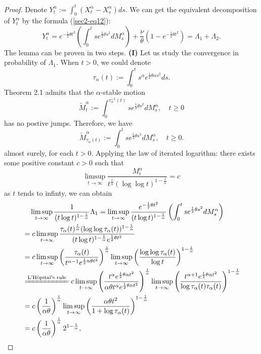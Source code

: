 \documentclass[11pt]{amsart}
\theoremstyle{plain}
\numberwithin{equation}{section}
\begin{document}
\begin{proof}
Denote $Y_t^\alpha:=\int_0^t \left(X_t^\alpha-X_s^\alpha\right)ds$. We can get the equivalent decomposition of $Y_t^\alpha$ by the formula (\ref{sec2-eq12}):
\begin{equation*}
Y_t^\alpha =  e^{-\frac{1}{2}\theta t^2} \left(\int_0^t se^{\frac{1}{2}\theta s^2}dM_s^\alpha \right) +\frac{\nu}{\theta}\left(1-e^{-\frac{1}{2}\theta t^2}\right)=\Lambda_1+\Lambda_2.
\end{equation*}
The lemma can be proven in two steps.
\textbf{(I)} Let us study the convergence in probability of $\Lambda_1$. When $t>0$, we could denote
$$
\tau_\alpha(t):=\int_0^t s^\alpha e^{\frac{1}{2}\theta \alpha s^2 }ds.
$$
Theorem 2.1 admits that the $\alpha$-stable motion
$$
\widetilde{M}_t^\alpha:=\int_0^{\tau_\alpha^{-1}(t)}se^{\frac{1}{2}\theta s^2}dM_s^\alpha,\quad t\geq 0
$$
has no postive jumps. Therefore, we have
$$
\widetilde{M}_{\tau_\alpha(t)}^\alpha:=\int_0^t se^{\frac{1}{2}\theta s^2}dM_s^\alpha,\quad t\geq 0.
$$
almost surely, for each $t>0$. Applying the law of iterated logarithm\cite{Breiman}: there exists some positive constant $c>0$ such that 
\begin{equation}\label{sec3-eq14}
\limsup_{t\rightarrow\infty}\frac{M_t^\alpha}{t^{\frac{1}{\alpha}}(\log\log t)^{1-\frac{1}{\alpha}}}=c
\end{equation}
as $t$ tends to infinty, we can obtain
\begin{equation*}
\begin{aligned}
&\quad\limsup_{t\rightarrow \infty}\frac{1}{(t\log t)^{1-\frac{1}{\alpha}}}\Lambda_1 =\limsup_{t\rightarrow\infty}\frac{e^{-\frac{1}{2}\theta t^2}}{(t\log t)^{1-\frac{1}{\alpha}}}\left(\int_0^t se^{\frac{1}{2}\theta s^2}dM_s^\alpha\right)\\
&=c \limsup_{t\rightarrow \infty}\frac{\tau_\alpha(t)^{\frac{1}{\alpha}}(\log\log \tau_\alpha(t))^{1-\frac{1}{\alpha}}}{(t\log t)^{1-\frac{1}{\alpha}}e^{\frac{1}{2}\theta t^2}}\\
& =c \limsup_{t\rightarrow\infty}\left(\frac{\tau_\alpha(t)}{t^{\alpha-1}e^{\frac{1}{2}\alpha\theta t^2}}\right)^{\frac{1}{\alpha}}\limsup_{t\rightarrow\infty}\left(\frac{\log\log \tau_\alpha(t)}{\log t}\right)^{1-\frac{1}{\alpha}}\\
& \xlongequal{\text{L'H\^{o}pital's rule}} c\limsup_{t\rightarrow\infty}\left(\frac{t^\alpha e^{\frac{1}{2}\theta \alpha t^2}}{\alpha \theta t^\alpha e^{\frac{1}{2}\theta \alpha t^2 }}\right)^{\frac{1}{\alpha}}\limsup_{t\rightarrow\infty}\left(\frac{t^{\alpha+1} e^{\frac{1}{2}\theta \alpha t^2}}{\log \tau_\alpha (t)\tau_\alpha(t)}\right)^{1-\frac{1}{\alpha}}\\
&=c\left(\frac{1}{\alpha\theta}\right)^{\frac{1}{\alpha}}\limsup_{t\rightarrow\infty}\left(\frac{\alpha \theta t^2}{1+\log \tau_\alpha(t)}\right)^{1-\frac{1}{\alpha}}\\
& = c\left(\frac{1}{\alpha\theta}\right)^{\frac{1}{\alpha}}2^{1-\frac{1}{\alpha}},
\end{aligned}
\end{equation*}


\end{proof}
\end{document}
